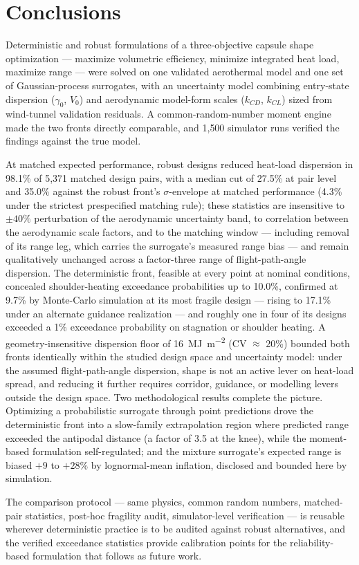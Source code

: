 \section{Conclusions}
\label{sec:conclusions}

Deterministic and robust formulations of a three-objective capsule shape
optimization --- maximize volumetric efficiency, minimize integrated heat
load, maximize range --- were solved on one validated aerothermal model and
one set of Gaussian-process surrogates, with an uncertainty model combining
entry-state dispersion ($\gamma_0$, $V_0$) and aerodynamic model-form scales
($k_{CD}$, $k_{CL}$) sized from wind-tunnel validation residuals. A
common-random-number moment engine made the two fronts directly comparable,
and 1{,}500 simulator runs verified the findings against the true model.

At matched expected performance, robust designs reduced heat-load
dispersion in 98.1\% of 5{,}371 matched design pairs, with a median cut
of 27.5\% at pair level and 35.0\% against the robust front's
$\sigma$-envelope at matched performance (4.3\% under the strictest
prespecified matching rule); these statistics are insensitive to
$\pm40\%$ perturbation of the aerodynamic uncertainty band, to
correlation between the aerodynamic scale factors, and to the matching
window --- including removal of its range leg, which carries the
surrogate's measured range bias --- and remain
qualitatively unchanged across a factor-three range of flight-path-angle
dispersion. The deterministic front, feasible at every point at
nominal conditions, concealed shoulder-heating exceedance probabilities up
to 10.0\%, confirmed at 9.7\% by Monte-Carlo simulation at its most
fragile design --- rising to 17.1\% under an alternate guidance
realization --- and roughly one in four of its designs exceeded a 1\%
exceedance probability on stagnation or shoulder heating. A
geometry-insensitive dispersion floor of
\SI{16}{\mega\joule\per\square\metre} (CV $\approx$ 20\%) bounded both
fronts identically within the studied design space and uncertainty model:
under the assumed flight-path-angle dispersion, shape is not an active
lever on heat-load spread, and reducing it further requires corridor,
guidance, or modelling levers outside the design space. Two methodological results complete the
picture. Optimizing a probabilistic surrogate through point predictions
drove the deterministic front into a slow-family extrapolation region
where predicted range exceeded the antipodal distance (a factor of 3.5 at
the knee), while the moment-based formulation self-regulated; and the
mixture surrogate's expected range is biased $+9$ to $+28\%$ by
lognormal-mean inflation, disclosed and bounded here by simulation.

The comparison protocol --- same physics, common random numbers,
matched-pair statistics, post-hoc fragility audit, simulator-level
verification --- is reusable wherever deterministic practice is to be
audited against robust alternatives, and the verified exceedance
statistics provide calibration points for the reliability-based
formulation that follows as future work.
